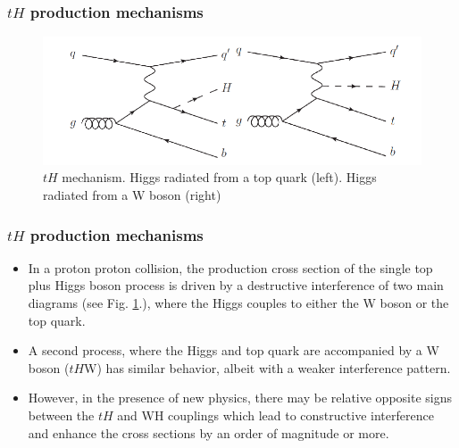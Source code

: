 \documentclass[11pt]{beamer}
\begin{document}
\begin{frame}
\frametitle{$tH$ production mechanisms}
\begin{center}
\begin{figure} 
\includegraphics[scale=0.4]{figures/tq.png} 
\caption{$tH$ mechanism. Higgs radiated from a top quark (left). Higgs radiated from a W boson (right)} 
\label{th}
\end{figure}
\end{center}
\end{frame}

\begin{frame}
\frametitle{$tH$ production mechanisms}
\begin{itemize}
\item In a proton proton collision, the production cross section of the single top plus Higgs boson process is driven by a
destructive interference of two main diagrams (see Fig. \ref{th}.), where the Higgs couples to either
the W boson or the top quark. 
\item  A second process, where the Higgs and top quark
are accompanied by a W boson ($tH$W) has similar behavior, albeit with a weaker interference
pattern.
\item However, in the presence of new physics, there may be relative opposite signs between the $tH$
and WH couplings which lead to constructive interference and enhance the cross sections by
an order of magnitude or more.
\end{itemize}
\end{frame}
\end{document}
